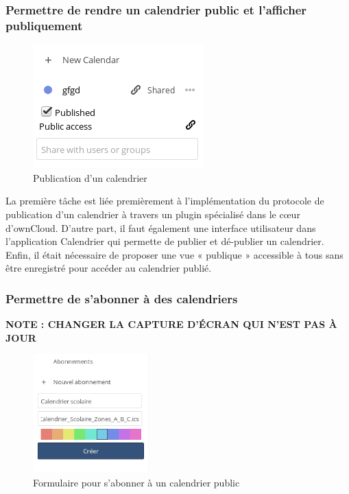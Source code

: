 \documentclass[10pt,a4paper, twoside]{report}
\begin{document}
	\subsubsection{Permettre de rendre un calendrier public et l'afficher publiquement}
	
	\begin{figure}
		\begin{center}
		\includegraphics[width=0.3\paperwidth]{images/fonctionnalitepublie.png}
	\end{center}
		\caption{Publication d'un calendrier}
	\end{figure}
	
	La première tâche est liée premièrement à l'implémentation du protocole de publication d'un calendrier à travers un plugin spécialisé dans le cœur d'ownCloud. D'autre part, il faut également une interface utilisateur dans l'application Calendrier qui permette de publier et dé-publier un calendrier. Enfin, il était nécessaire de proposer une vue « publique » accessible à tous sans être enregistré pour accéder au calendrier publié.
	
	\subsubsection{Permettre de s'abonner à des calendriers}
	
	\textbf{\color{red}NOTE : CHANGER LA CAPTURE D'ÉCRAN QUI N'EST PAS À JOUR}
	
	\begin{figure}
		\begin{center}
			\includegraphics[width=0.40\textwidth]{images/creation_abonnement.png}
		\end{center}
		\caption*{Formulaire pour s'abonner à un calendrier public}
	\end{figure}
	
\end{document}
